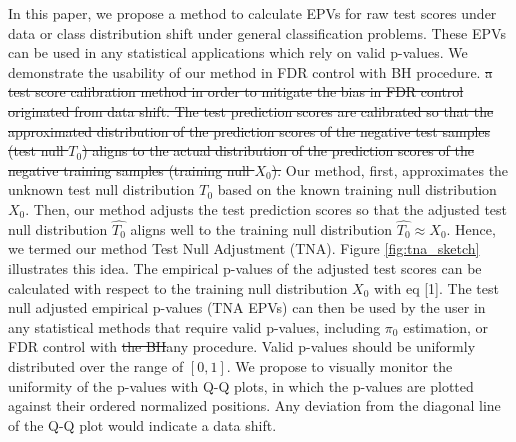 \documentclass{article}
\newcommand{\correction}[2]{{\color{red}\sout{#1}}{\color{red}#2}}
\newcommand{\edit}[1]{{\color{red}#1}}
\begin{document}
In this paper, \edit{we propose a method to calculate EPVs for raw test scores under data or class distribution shift under general classification problems. These EPVs can be used in any statistical applications which rely on valid p-values. We demonstrate the usability of our method in FDR control with BH procedure.} \correction{ a test score calibration method in order to mitigate the bias in FDR control originated from data shift. The test prediction scores are calibrated so that the approximated distribution of the prediction scores of the negative test samples (test null $T_0$) aligns to the actual distribution of the prediction scores of the negative training samples (training null $X_0$).}{} \edit{Our method, first, approximates the unknown test null distribution $T_0$ based on the known training null distribution $X_0$. Then, our method adjusts the test prediction scores so that the adjusted test null distribution $\hat{T_0}$ aligns well to the training null distribution $\hat{T_0}\approx X_0$}. Hence, we termed our method Test Null Adjustment (TNA). Figure \ref{fig:tna_sketch} illustrates this idea.  The empirical p-values of the adjusted test scores can be calculated with respect to the training null distribution $X_0$ with eq [1]. The test null adjusted empirical p-values (TNA EPVs) can then be used \edit{ by the user in any statistical methods that require valid p-values, including $\pi_0$ estimation, or } FDR control with \correction{the BH}{any} procedure. Valid p-values should be uniformly distributed over the range of $[0,1]$.  We propose to visually monitor the uniformity of the p-values with Q-Q plots, in which the p-values are plotted against their ordered normalized positions. Any deviation from the diagonal line of the Q-Q plot would indicate a data shift.
\end{document}
